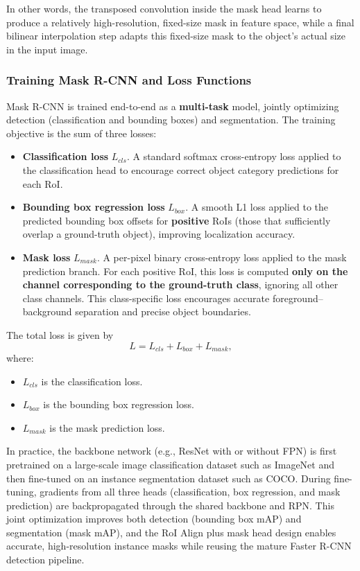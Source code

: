 \noindent In other words, the transposed convolution inside the mask head learns to produce a relatively high-resolution, fixed-size mask in feature space, while a final bilinear interpolation step adapts this fixed-size mask to the object’s actual size in the input image.

\subsubsection{Training Mask R-CNN and Loss Functions}

\noindent Mask R-CNN is trained end-to-end as a \textbf{multi-task} model, jointly optimizing detection (classification and bounding boxes) and segmentation. The training objective is the sum of three losses:

\begin{itemize}
	\item \textbf{Classification loss} \(L_{cls}\). A standard softmax cross-entropy loss applied to the classification head to encourage correct object category predictions for each RoI.
	\item \textbf{Bounding box regression loss} \(L_{box}\). A smooth L1 loss applied to the predicted bounding box offsets for \textbf{positive} RoIs (those that sufficiently overlap a ground-truth object), improving localization accuracy.
	\item \textbf{Mask loss} \(L_{mask}\). A per-pixel binary cross-entropy loss applied to the mask prediction branch. For each positive RoI, this loss is computed \textbf{only on the channel corresponding to the ground-truth class}, ignoring all other class channels. This class-specific loss encourages accurate foreground–background separation and precise object boundaries.
\end{itemize}

\noindent The total loss is given by
\[
L = L_{cls} + L_{box} + L_{mask},
\]
where:
\begin{itemize}
	\item \(L_{cls}\) is the classification loss.
	\item \(L_{box}\) is the bounding box regression loss.
	\item \(L_{mask}\) is the mask prediction loss.
\end{itemize}

\noindent In practice, the backbone network (e.g., ResNet with or without FPN) is first pretrained on a large-scale image classification dataset such as ImageNet and then fine-tuned on an instance segmentation dataset such as COCO. During fine-tuning, gradients from all three heads (classification, box regression, and mask prediction) are backpropagated through the shared backbone and RPN. This joint optimization improves both detection (bounding box mAP) and segmentation (mask mAP), and the RoI Align plus mask head design enables accurate, high-resolution instance masks while reusing the mature Faster R-CNN detection pipeline.

